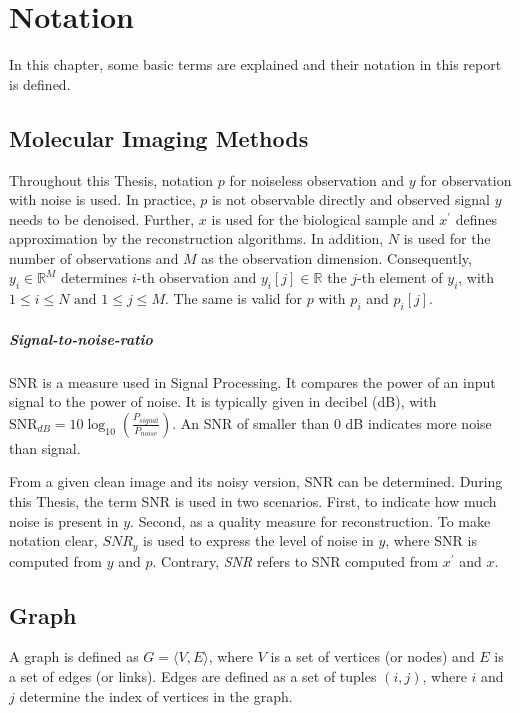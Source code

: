 \chapter{Notation}
\label{sec:notation}

In this chapter, some basic terms are explained and their notation in this report is defined.

\section{Molecular Imaging Methods}
Throughout this Thesis, notation $p$ for noiseless observation and $y$ for observation with noise is used.
In practice, $p$ is not observable directly and observed signal $y$ needs to be denoised.
Further, $x$ is used for the biological sample and $x^{\prime}$ defines approximation by the reconstruction algorithms.
In addition, $N$ is used for the number of observations and $M$ as the observation dimension.
Consequently, $y_i \in \mathbb{R}^M$ determines $i$-th observation and $y_i[j] \in \mathbb{R}$ the $j$-th element of $y_i$,
with $ 1 \leq i \leq N \text{ and } 1 \leq j \leq M$. The same is valid for $p$ with $p_i$ and $p_i[j]$. 


\paragraph{Signal-to-noise-ratio}
SNR is a measure used in Signal Processing. 
It compares the power of an input signal to the power of noise. It is typically given in decibel (dB), with
$\text{SNR}_{dB} = 10 \log_{10} \left(  \frac{P_{signal}}{P_{noise}} \right)$.
An SNR of smaller than 0 dB indicates more noise than signal.

From a given clean image and its noisy version, SNR can be determined.
During this Thesis, the term SNR is used  in two scenarios.
First, to indicate how much noise is present in $y$. Second, as a quality measure for reconstruction.
To make notation clear, $\textit{SNR}_y$ is used to express the level of noise in $y$, 
where SNR is computed from $y$ and $p$.
Contrary, \textit{SNR} refers to SNR computed from $x^{\prime}$ and $x$.

\section{Graph}
A graph is defined as $G = \langle V,E \rangle$, where $V$ is a set of 
vertices (or nodes) and $E$ is a set of edges (or links). 
Edges are defined as a set of tuples $(i, j)$, where $i$ and $j$ determine 
the index of vertices in the graph.

